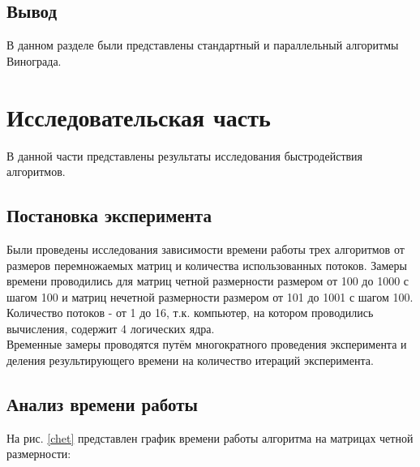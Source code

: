 \documentclass[a4paper, 14pt]{article}
\begin{document}
	\subsection{Вывод}
	В данном разделе были представлены стандартный и параллельный алгоритмы Винограда.

	\newpage
	\section{Исследовательская часть}
	В данной части представлены результаты  исследования быстродействия алгоритмов.\\

	\subsection{Постановка эксперимента}
	
	Были проведены исследования зависимости времени работы трех алгоритмов от размеров перемножаемых матриц и количества использованных потоков. Замеры времени проводились для матриц четной размерности размером от 100 до 1000 с шагом 100 и матриц нечетной размерности размером от 101 до 1001 с шагом 100. Количество потоков - от 1 до 16, т.к. компьютер, на котором проводились вычисления, содержит 4 логических ядра.\\
	
	 Временные замеры проводятся путём многократного проведения эксперимента и деления результирующего времени на количество итераций эксперимента. \\
	
	\newpage
	\subsection{Анализ времени работы}
	
	На рис. \ref{chet} представлен график времени работы алгоритма на матрицах четной размерности:
	
\end{document}

